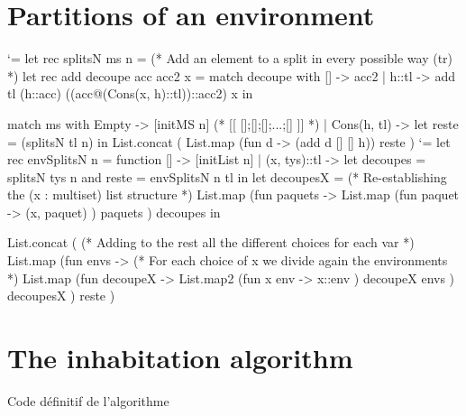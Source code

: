 \documentclass{article}
\let\origlstlisting=\lstlisting
\let\endoriglstlisting=\endlstlisting
\renewenvironment{lstlisting}
{\mathcode`\-=\hyphenmathcode
    \everymath{}\mathsurround=0pt\origlstlisting}
{\endoriglstlisting}
\begin{document}
\section{Partitions of an environment}
\label {a_part}
\begin{lstlisting}
let rec splitsN ms n = 
  (* Add an element to a split in every possible way (tr) *)
  let rec add decoupe acc acc2 x = match decoupe with 
    [] -> acc2
    | h::tl -> 
        add tl (h::acc) ((acc@(Cons(x, h)::tl))::acc2) x
  in
   
  match ms with
    Empty -> [initMS n] (* [[ [];[];[];...;[] ]] *)
    | Cons(h, tl) -> let reste = (splitsN tl n) in
       List.concat (
         List.map (fun d ->  (add d [] [] h)) reste
       )
\end{lstlisting}
\begin{lstlisting}
let rec envSplitsN n = function
  [] -> [initList n]
  | (x, tys)::tl -> let decoupes = splitsN tys n 
                       and reste = envSplitsN n tl in
    let decoupesX = 
      (* Re-establishing 
          the (x : multiset) list structure *)
      List.map (fun paquets -> 
        List.map (fun paquet -> 
            (x, paquet)
        ) paquets
      ) decoupes in
            
    List.concat (
      (* Adding to the rest all the different
          choices for each var *)
      List.map (fun envs -> 
        (* For each choice of x 
            we divide again the environments *)
        List.map (fun decoupeX -> 
          List.map2 (fun x env -> 
            x::env
          ) decoupeX envs
        ) decoupesX
      ) reste
    )
\end{lstlisting}

\newpage
\section{The inhabitation algorithm}
Code définitif de l'algorithme
\end{document}
